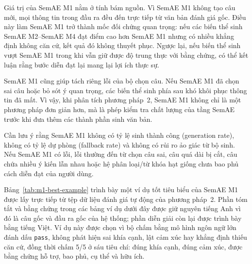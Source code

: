 Giá trị của SemAE M1 nằm ở tính bám nguồn. Vì SemAE M1 không tạo câu mới, mọi thông tin trong đầu ra đều đến trực tiếp từ văn bản đánh giá gốc. Điều này làm SemAE M1 trở thành mốc đối chứng quan trọng: nếu các biến thể sinh SemAE M2--SemAE M4 đạt điểm cao hơn SemAE M1 nhưng có nhiều khẳng định không căn cứ, kết quả đó không thuyết phục. Ngược lại, nếu biến thể sinh vượt SemAE M1 trong khi vẫn giữ được độ trung thực với bằng chứng, có thể kết luận rằng bước diễn đạt lại mang lại lợi ích thực sự.

SemAE M1 cũng giúp tách riêng lỗi của bộ chọn câu. Nếu SemAE M1 đã chọn sai câu hoặc bỏ sót ý quan trọng, các biến thể sinh phía sau khó khôi phục thông tin đã mất. Vì vậy, khi phân tích phương pháp~2, SemAE M1 không chỉ là một phương pháp đơn giản hơn, mà là phép kiểm tra chất lượng của tầng SemAE trước khi đưa thêm các thành phần sinh văn bản.

Cần lưu ý rằng SemAE M1 không có tỷ lệ sinh thành công (generation rate), không có tỷ lệ dự phòng (fallback rate) và không có rủi ro ảo giác từ bộ sinh. Nếu SemAE M1 có lỗi, lỗi thường đến từ chọn câu sai, câu quá dài bị cắt, câu chứa nhiều ý kiến lẫn nhau hoặc hệ phân loại/từ khóa hạt giống chưa bao phủ cách diễn đạt của người dùng.

Bảng~\ref{tab:m1-best-example} trình bày một ví dụ tốt tiêu biểu của SemAE M1 được lấy trực tiếp từ tệp dữ liệu đánh giá tự động của phương pháp~2. Phần tóm tắt và bằng chứng trong các bảng ví dụ dưới đây được giữ nguyên tiếng Anh vì đó là câu gốc và đầu ra gốc của hệ thống; phần diễn giải còn lại được trình bày bằng tiếng Việt. Ví dụ này được chọn vì bộ chấm bằng mô hình ngôn ngữ lớn đánh dấu \texttt{pass}, không phát hiện sai khía cạnh, lật cảm xúc hay khẳng định thiếu căn cứ, đồng thời chấm 5/5 ở sáu tiêu chí: đúng khía cạnh, đúng cảm xúc, được bằng chứng hỗ trợ, bao phủ, cụ thể và hữu ích.

